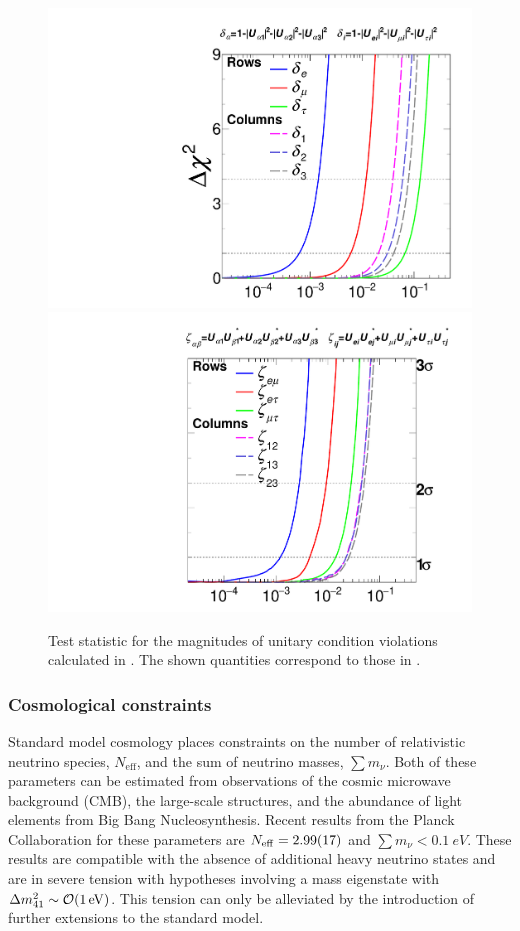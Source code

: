 \begin{figure}
    \centering
    \includegraphics[width=0.49\linewidth]{figures/theory/Norm.pdf}
    \includegraphics[width=0.49\linewidth]{figures/theory/Clos_temp.pdf}
    \caption{Test statistic for the magnitudes of unitary condition violations calculated in \cite{global_unitarity_Hu}. The shown quantities correspond to those in .\label{fig:nonunitary-global-fits}}
\end{figure}

\subsubsection{Cosmological constraints}
Standard model cosmology places constraints on the number of relativistic neutrino species, $N_\mathrm{eff}$, and the sum of neutrino masses, $\sum m_\nu$. Both of these parameters can be estimated from observations of the cosmic microwave background (CMB), the large-scale structures, and the abundance of light elements from Big Bang Nucleosynthesis. Recent results from the Planck Collaboration for these parameters are $N_\mathrm{eff}=\num{2.99+-0.17}$ and $\sum m_\nu < \SI{0.1}{eV}$. These results are compatible with the absence of additional heavy neutrino states and are in severe tension with hypotheses involving a mass eigenstate with $\Delta m^2_{41} \sim \order{\SI{1}{eV}}$.
This tension can only be alleviated by the introduction of further extensions to the standard model.
